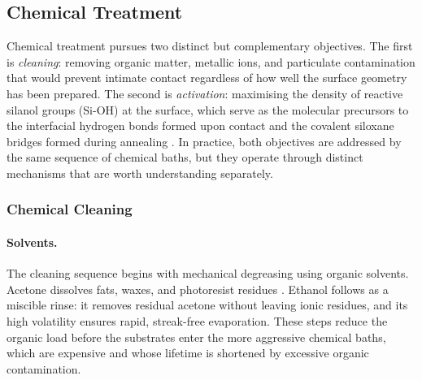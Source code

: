 \subsection{Chemical Treatment}

Chemical treatment pursues two distinct but complementary objectives. 
The first is \textit{cleaning}: removing organic matter, metallic ions, 
and particulate contamination that would prevent intimate contact 
regardless of how well the surface geometry has been prepared. The 
second is \textit{activation}: maximising the density of reactive 
silanol groups (Si-OH) at the surface, which serve as the molecular 
precursors to the interfacial hydrogen bonds formed upon contact and 
the covalent siloxane bridges formed during annealing \cite{kissinger1990}. In practice, 
both objectives are addressed by the same sequence of chemical baths, 
but they operate through distinct mechanisms that are worth 
understanding separately.

\subsubsection*{Chemical Cleaning}

\paragraph{Solvents.}
The cleaning sequence begins with mechanical degreasing using organic 
solvents. Acetone dissolves fats, waxes, and photoresist residues \cite{acetone_art}. 
Ethanol follows as a miscible rinse: it removes 
residual acetone without leaving ionic residues, and its high volatility 
ensures rapid, streak-free evaporation. 
These steps reduce the organic load before the substrates enter 
the more aggressive chemical baths, which are expensive and whose 
lifetime is shortened by excessive organic contamination.

